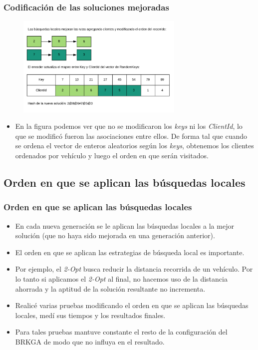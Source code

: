 \documentclass{beamer}
\begin{document}
\begin{frame}
\frametitle{Codificación de las soluciones mejoradas}

\begin{figure}[h]
	\centering
	\includegraphics[width=8cm]{codificacionDeSolucionParteDos}
	\label{fig:codificacionDeSolucionParteDos}
\end{figure}

\begin{itemize}
    \item En la figura podemos ver que no se modificaron los \textit{keys} ni los \textit{ClientId}, lo que se modificó fueron las asociaciones entre ellos. De forma tal que cuando se ordena el vector de enteros aleatorios según los \textit{keys}, obtenemos los clientes ordenados por vehículo y luego el orden en que serán visitados.
\end{itemize}

\end{frame}


\subsection{Orden en que se aplican las búsquedas locales}

\begin{frame}
\frametitle{Orden en que se aplican las búsquedas locales}

\begin{itemize}
    \item En cada nueva generación se le aplican las búsquedas locales a la mejor solución (que no haya sido mejorada en una generación anterior).
    \pause
    \item El orden en que se aplican las estrategias de búsqueda local es importante.
    \pause
    \item Por ejemplo, el \textit{2-Opt} busca reducir la distancia recorrida de un vehículo. Por lo tanto si aplicamos el \textit{2-Opt} al final, no hacemos uso de la distancia ahorrada y la aptitud de la solución resultante no incrementa.
    \pause
    \item Realicé varias pruebas modificando el orden en que se aplican las búsquedas locales, medí sus tiempos y los resultados finales.
    \pause
    \item Para tales pruebas mantuve constante el resto de la configuración del BRKGA de modo que no influya en el resultado.
\end{itemize}

\end{frame}
\end{document}
